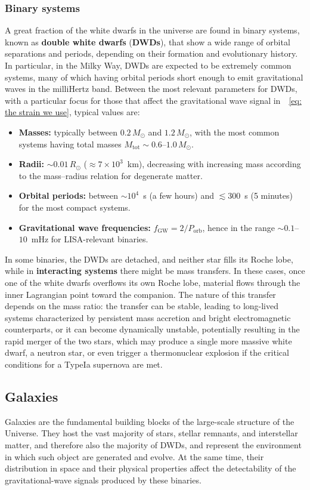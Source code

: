 \subsubsection{Binary systems}
A great fraction of the white dwarfs in the universe are found in binary systems, known as \textbf{double white dwarfs} (\textbf{DWDs}), that show a wide range of orbital separations and periods, depending on their formation and evolutionary history.  
In particular, in the Milky Way, DWDs are expected to be extremely common systems, many of which having orbital periods short enough to emit gravitational waves in the milliHertz band.  
Between the most relevant parameters for DWDs, with a particular focus for those that affect the gravitational wave signal in~~\eqref{eq: the strain we use}, typical values are:
\begin{itemize}
    \item \textbf{Masses:} typically between $0.2\,M_\odot$ and $1.2\,M_\odot$, with the most common systems having total masses $M_{\mathrm{tot}} \sim 0.6$--$1.0\,M_\odot$.
    \item \textbf{Radii:} $\sim 0.01\,R_\odot$ ($\approx 7\times 10^{3}$~km), decreasing with increasing mass according to the mass–radius relation for degenerate matter.
    \item \textbf{Orbital periods:} between $\sim 10^{4}$~s (a few hours) and $\lesssim 300$~s (5 minutes) for the most compact systems.
    \item \textbf{Gravitational wave frequencies:} $f_{\mathrm{GW}} = 2/P_{\mathrm{orb}}$, hence in the range $\sim 0.1$--$10$~mHz for LISA-relevant binaries.
\end{itemize}
In some binaries, the DWDs are detached, and neither star fills its Roche lobe, while in \textbf{interacting systems} there might be mass transfers.
In these cases, once one of the white dwarfs overflows its own Roche lobe, material flows through the inner Lagrangian point toward the companion.
The nature of this transfer depends on the mass ratio: the transfer can be stable, leading to long-lived systems characterized by persistent mass accretion and bright electromagnetic counterparts, or it can become dynamically unstable, potentially resulting in the rapid merger of the two stars, which may produce a single more massive white dwarf, a neutron star, or even trigger a thermonuclear explosion if the critical conditions for a TypeIa supernova are met.


\subsection{Galaxies}
Galaxies are the fundamental building blocks of the large-scale structure of the Universe. 
They host the vast majority of stars, stellar remnants, and interstellar matter, and therefore also the majority of DWDs, and represent the environment in which such object are generated and evolve.  
At the same time, their distribution in space and their physical properties affect the detectability of the gravitational-wave signals produced by these binaries.  

